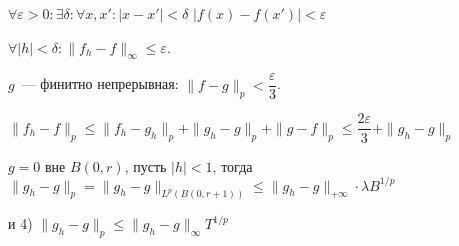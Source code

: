 \documentclass{article}
\begin{document}
            $\forall \varepsilon > 0 : \exists \delta : \forall x, x' : |x - x'| < \delta$ $| f(x) - f(x')| < \varepsilon$
            
            $\forall |h| < \delta : \| f_h - f \|_{\infty} \leqslant \varepsilon$.
        
            $g$~--- финитно непрерывная: $\| f - g \|_p < \dfrac{\varepsilon}{3}$.
            
            $\| f_h - f \|_p \leqslant \| f_h - g_h \|_p + \| g_h - g \|_p + \| g - f \|_p \leqslant \dfrac{2 \varepsilon}{3} + \| g_h - g \|_p$
            
            $g = 0$ вне $B(0, r)$, пусть $|h| < 1$, тогда $\| g_h - g \|_p = \| g_h - g\|_{L^p \left( B(0, r + 1) \right)} \leqslant \| g_h - g \|_{+\infty} \cdot \lambda B^{1/p}$
            
            и 4) $\| g_h - g \|_p \leqslant \| g_h - g \|_{\infty} T^{1/p}$
            
            
\end{document}
